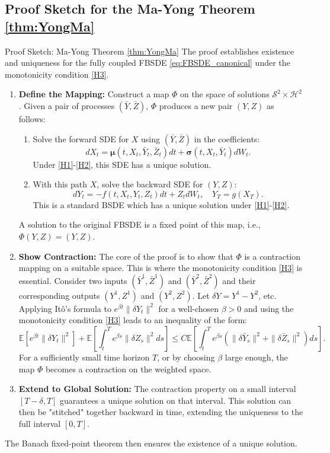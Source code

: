 \subsection{Proof Sketch for the Ma-Yong Theorem \ref{thm:YongMa}}
\label{app:YongMaProof_appendix}
\begin{leanproofbox}{Proof Sketch: Ma-Yong Theorem \ref{thm:YongMa}}
The proof establishes existence and uniqueness for the fully coupled FBSDE \eqref{eq:FBSDE_canonical} under the monotonicity condition \ref{H3}.

\begin{enumerate}
    \item \textbf{Define the Mapping:} Construct a map \(\Phi\) on the space of solutions \(\mathcal{S}^2 \times \mathcal{H}^2\). Given a pair of processes \((\bar{Y}, \bar{Z})\), \(\Phi\) produces a new pair \((Y,Z)\) as follows:
    \begin{enumerate}
        \item Solve the forward SDE for \(X\) using \((\bar{Y}, \bar{Z})\) in the coefficients:
        \[ dX_t = \bm\mu(t, X_t, \bar{Y}_t, \bar{Z}_t)dt + \bm\sigma(t, X_t, \bar{Y}_t)dW_t. \]
        Under \ref{H1}-\ref{H2}, this SDE has a unique solution.
        \item With this path \(X\), solve the backward SDE for \((Y,Z)\):
        \[ dY_t = -f(t, X_t, Y_t, Z_t)dt + Z_t dW_t, \quad Y_T = g(X_T). \]
        This is a standard BSDE which has a unique solution under \ref{H1}-\ref{H2}.
    \end{enumerate}
    A solution to the original FBSDE is a fixed point of this map, i.e., \(\Phi(Y,Z) = (Y,Z)\).

    \item \textbf{Show Contraction:} The core of the proof is to show that \(\Phi\) is a contraction mapping on a suitable space. This is where the monotonicity condition \ref{H3} is essential. Consider two inputs \((\bar{Y}^1, \bar{Z}^1)\) and \((\bar{Y}^2, \bar{Z}^2)\) and their corresponding outputs \((Y^1, Z^1)\) and \((Y^2, Z^2)\). Let \(\delta Y = Y^1 - Y^2\), etc. Applying Itô's formula to \(e^{\beta t}\|\delta Y_t\|^2\) for a well-chosen \(\beta > 0\) and using the monotonicity condition \ref{H3} leads to an inequality of the form:
    \[ \mathbb{E}[e^{\beta t}\|\delta Y_t\|^2] + \mathbb{E}\left[\int_t^T e^{\beta s}\|\delta Z_s\|^2 ds\right] \le C \mathbb{E}\left[\int_t^T e^{\beta s} (\|\delta \bar{Y}_s\|^2 + \|\delta \bar{Z}_s\|^2) ds\right]. \]
    For a sufficiently small time horizon \(T\), or by choosing \(\beta\) large enough, the map \(\Phi\) becomes a contraction on the weighted space.

    \item \textbf{Extend to Global Solution:} The contraction property on a small interval \([T-\delta, T]\) guarantees a unique solution on that interval. This solution can then be "stitched" together backward in time, extending the uniqueness to the full interval \([0,T]\).
\end{enumerate}
The Banach fixed-point theorem then ensures the existence of a unique solution.
\end{leanproofbox}

